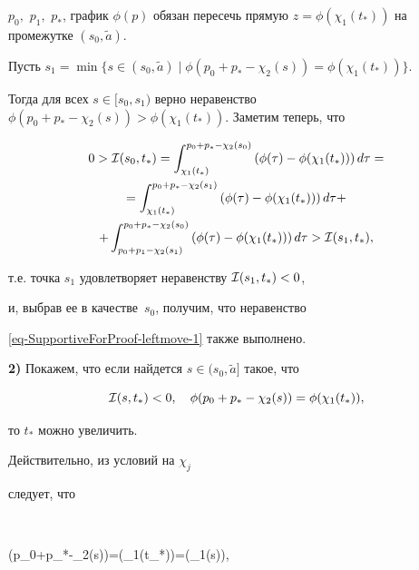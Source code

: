 $p_0,$ $p_1,$ $p_*$, график $\phi(p)$ обязан пересечь прямую ${z=\phi(\chi_1(t_*))}$ на промежутке $(s_0,\widetilde{a})$. 



Пусть $s_1=\min\{s\in(s_0,\widetilde{a})\mid\phi(p_0+p_*-\chi_2(s))=\phi(\chi_1(t_*))\}$.

Тогда для всех $s\in[s_0,s_1)$ верно неравенство $\phi(p_0+p_*-\chi_2(s))>\phi(\chi_1(t_*))$. Заметим теперь, что

\begin{multline}

0>{\cal

I}(s_0,t_*)=\int _{\chi_1(t_*)}^{p_0+p_*-\chi_2(s_0)}\left(\phi(\tau)-\phi(\chi_1(t_*))\right)d\tau=

\\

=\int _{\chi_1(t_*)}^{p_0+p_*-\chi_2(s_1)}\left(\phi(\tau)-\phi(\chi_1(t_*))\right)d\tau+ 

\\

+

 \int _{p_0+p_1-\chi_2(s_1)}^{p_0+p_*-\chi_2(s_0)}\left(\phi(\tau)-\phi(\chi_1(t_*))\right)d\tau>{\cal

I}(s_1,t_*),

\end{multline}

т.е. точка $s_1$ удовлетворяет неравенству ${\cal I}(s_1,t_*)<0$,

и, выбрав ее в качестве~$s_0$, получим, что неравенство

\eqref{eq-SupportiveForProof-leftmove-1} также выполнено.





{\bf 2)} Покажем, что если найдется $s\in(s_0,\widetilde{a}]$ такое, что

\begin{equation}

\label{palin:add1}

{\cal I}(s,t_*)<0,\quad  \phi(p_0+p_*-\chi_2(s))=\phi(\chi_1(t_*)),

\end{equation}

то $t_*$ можно увеличить. 



Действительно, из условий на $\chi_j$

следует, что

$$

\phi(p_0+p_*-\chi_2(s))=\phi(\chi_1(t_*))=\phi(\chi_1(s)),

